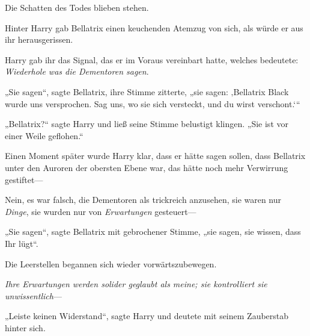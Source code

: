 Die Schatten des Todes blieben stehen.

Hinter Harry gab Bellatrix einen keuchenden Atemzug von sich, als würde er aus ihr herausgerissen.

Harry gab ihr das Signal, das er im Voraus vereinbart hatte, welches bedeutete: \emph{Wiederhole was die Dementoren sagen}.

„Sie sagen“, sagte Bellatrix, ihre Stimme zitterte, „sie sagen: ‚Bellatrix Black wurde uns versprochen. Sag uns, wo sie sich versteckt, und du wirst verschont.‘“

„Bellatrix?“ sagte Harry und ließ seine Stimme belustigt klingen.
„Sie ist vor einer Weile geflohen.“

Einen Moment später wurde Harry klar, dass er hätte sagen sollen, dass Bellatrix unter den Auroren der obersten Ebene war, das hätte noch mehr Verwirrung gestiftet—

Nein, es war falsch, die Dementoren als trickreich anzusehen, sie waren nur \emph{Dinge}, sie wurden nur von \emph{Erwartungen} gesteuert—

„Sie sagen“, sagte Bellatrix mit gebrochener Stimme, „sie sagen, sie wissen, dass Ihr lügt“.

Die Leerstellen begannen sich wieder vorwärtszubewegen.

\emph{Ihre Erwartungen werden solider geglaubt als meine; sie kontrolliert sie unwissentlich}—

„Leiste keinen Widerstand“, sagte Harry und deutete mit seinem Zauberstab hinter sich.

